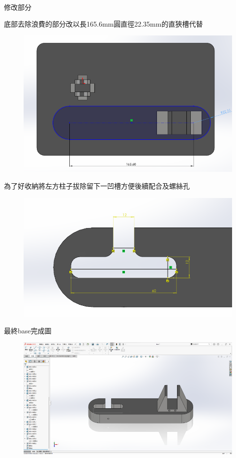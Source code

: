 \noindent 修改部分

\noindent 底部去除浪費的部分改以長165.6mm圓直徑22.35mm的直狹槽代替

\begin{figure}[h!]
    \centering
    \includegraphics[width=1\textwidth]{./../images/6-1-37.png}
\end{figure}

\noindent 為了好收納將左方柱子拔除留下一凹槽方便後續配合及螺絲孔

\begin{figure}[h!]
    \centering
    \includegraphics[width=1\textwidth]{./../images/6-1-38.png}
\end{figure}

\noindent 最終base完成圖

\begin{figure}[h!]
    \centering
    \includegraphics[width=1\textwidth]{./../images/6-1-39.png}
\end{figure}


